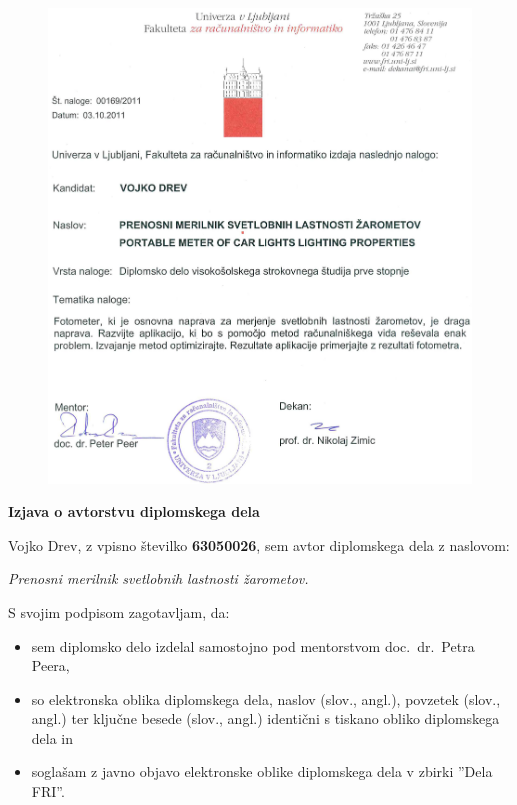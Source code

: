 \documentclass[oneside, a4paper, 12pt]{book}
\newcommand{\clearemptydoublepage}{\newpage{\pagestyle{empty}\cleardoublepage}}
\begin{document}
\begin{figure}
\begin{center}
\includegraphics[keepaspectratio=true, width=13.5cm]{slike/original-teme.jpg}
\end{center}
\end{figure}

\clearemptydoublepage

\vspace*{1cm}
\begin{center} 
{\Large \textbf{\sc Izjava o avtorstvu diplomskega dela}}
\end{center}

\vspace{1cm}
\noindent Vojko Drev,
z vpisno številko \textbf{63050026}, sem avtor  diplomskega dela z 
naslovom:
   
\vspace{0.5cm}
\emph{Prenosni merilnik svetlobnih lastnosti žarometov.}

\vspace{1.5cm}
\noindent S svojim podpisom zagotavljam, da:
\begin{itemize}
	\item sem diplomsko delo izdelal samostojno pod mentorstvom 
		doc.\ dr.\ Petra Peera,

	\item	so elektronska oblika diplomskega dela, naslov (slov., angl.), 
	povzetek (slov., angl.) ter ključne besede (slov., angl.) identični s 
	tiskano obliko diplomskega dela in
	\item soglašam z javno objavo elektronske oblike diplomskega dela 
	v zbirki ''Dela FRI''.
\end{itemize}
\end{document}
